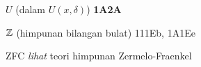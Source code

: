\indexmedskip
{}

$U$ (dalam $U(x,\delta)$) {\bf 1A2A}

































\indexmedskip
{}

$\Bbb Z$ (himpunan bilangan bulat) 111Eb, 1A1Ee







ZFC {\it lihat} teori himpunan Zermelo-Fraenkel

 



 






 













































\indexmedskip
\indexheader{$\scriptstyle\pmb{\pi}$}







